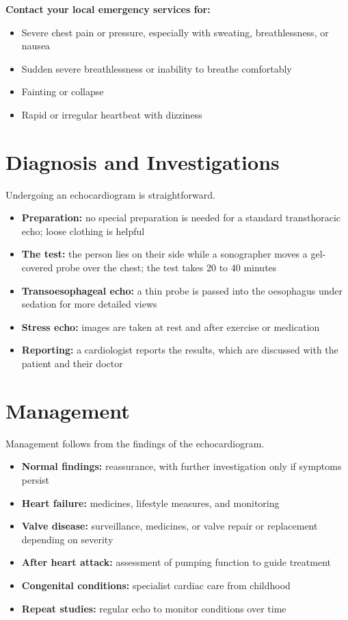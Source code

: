 \textbf{Contact your local emergency services for:}
\begin{itemize}
    \item Severe chest pain or pressure, especially with sweating, breathlessness, or nausea
    \item Sudden severe breathlessness or inability to breathe comfortably
    \item Fainting or collapse
    \item Rapid or irregular heartbeat with dizziness
\end{itemize}

\section*{Diagnosis and Investigations}
Undergoing an echocardiogram is straightforward.
\begin{itemize}
    \item \textbf{Preparation:} no special preparation is needed for a standard transthoracic echo; loose clothing is helpful
    \item \textbf{The test:} the person lies on their side while a sonographer moves a gel-covered probe over the chest; the test takes 20 to 40 minutes
    \item \textbf{Transoesophageal echo:} a thin probe is passed into the oesophagus under sedation for more detailed views
    \item \textbf{Stress echo:} images are taken at rest and after exercise or medication
    \item \textbf{Reporting:} a cardiologist reports the results, which are discussed with the patient and their doctor
\end{itemize}

\section*{Management}
Management follows from the findings of the echocardiogram.
\begin{itemize}
    \item \textbf{Normal findings:} reassurance, with further investigation only if symptoms persist
    \item \textbf{Heart failure:} medicines, lifestyle measures, and monitoring
    \item \textbf{Valve disease:} surveillance, medicines, or valve repair or replacement depending on severity
    \item \textbf{After heart attack:} assessment of pumping function to guide treatment
    \item \textbf{Congenital conditions:} specialist cardiac care from childhood
    \item \textbf{Repeat studies:} regular echo to monitor conditions over time
\end{itemize}

